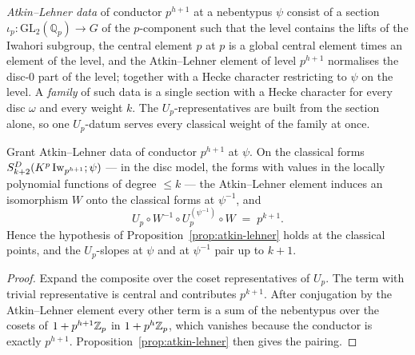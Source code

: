 \begin{definition}
  \label{def:al-data}
  \leanok
  \emph{Atkin--Lehner data} of conductor $p^{h+1}$ at a nebentypus $\psi$ consist of a section
  $\iota_p : \mathrm{GL}_2(\mathbb{Q}_p) \to G$ of the $p$-component such that the level contains
  the lifts of the Iwahori subgroup, the central element $p$ at $p$ is a global central element
  times an element of the level, and the Atkin--Lehner element of level $p^{h+1}$ normalises the
  disc-$0$ part of the level; together with a Hecke character restricting to $\psi$ on the level.
  A \emph{family} of such data is a single section with a Hecke character for every disc $\omega$
  and every weight $k$.  The $U_p$-representatives are built from the section alone, so one
  $U_p$-datum serves every classical weight of the family at once.
\end{definition}

\begin{proposition}
  \label{prop:al-identity}
  \leanok
  Grant Atkin--Lehner data of conductor $p^{h+1}$ at $\psi$.  On the classical forms
  $S^{D}_{k+2}(K^{p}\operatorname{Iw}_{p^{h+1}};\psi)$ --- in the disc model, the forms with values in the
  locally polynomial functions of degree $\leq k$ --- the Atkin--Lehner element induces an
  isomorphism $W$ onto the classical forms at $\psi^{-1}$, and
  \[
    U_p \circ W^{-1} \circ U_p^{(\psi^{-1})} \circ W \;=\; p^{k+1} .
  \]
  Hence the hypothesis of Proposition~\ref{prop:atkin-lehner} holds at the classical points, and
  the $U_p$-slopes at $\psi$ and at $\psi^{-1}$ pair up to $k+1$.
\end{proposition}

\begin{proof}
  \leanok
  Expand the composite over the coset representatives of $U_p$.  The term with trivial
  representative is central and contributes $p^{k+1}$.  After conjugation by the Atkin--Lehner
  element every other term is a sum of the nebentypus over the cosets of $1 + p^{h+1}\mathbb{Z}_p$ in
  $1 + p^{h}\mathbb{Z}_p$, which vanishes because the conductor is exactly $p^{h+1}$.
  Proposition~\ref{prop:atkin-lehner} then gives the pairing.
\end{proof}

